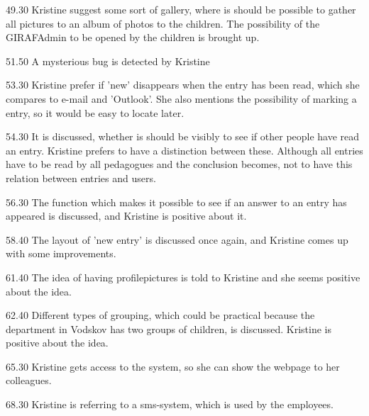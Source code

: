 49.30
Kristine suggest some sort of gallery, where is should be possible to gather all pictures to an album of photos to the children. The possibility of the GIRAFAdmin to be opened by the children is brought up.

51.50
A mysterious bug is detected by Kristine

53.30
Kristine prefer if 'new' disappears when the entry has been read, which she compares to e-mail and 'Outlook'. She also mentions the possibility of marking a entry, so it would be easy to locate later.

54.30
It is discussed, whether is should be visibly to see if other people have read an entry. Kristine prefers to have a distinction between these. Although all entries have to be read by all pedagogues and the conclusion becomes, not to have this relation between entries and users.

56.30
The function which makes it possible to see if an answer to an entry has appeared is discussed, and Kristine is positive about it.

58.40
The layout of 'new entry' is discussed once again, and Kristine comes up with some improvements.

61.40
The idea of having profilepictures is told to Kristine and she seems positive about the idea.

62.40
Different types of grouping, which could be practical because the department in Vodskov has two groups of children, is discussed. Kristine is positive about the idea.

65.30
Kristine gets access to the system, so she can show the webpage to her colleagues.

68.30
Kristine is referring to a sms-system, which is used by the employees. 